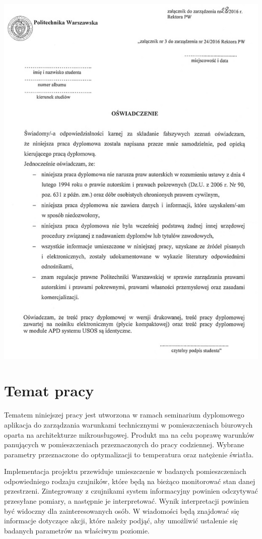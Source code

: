 \documentclass[11pt, a4]{article} %
\begin{document}
\includegraphics[width=1\textwidth]{oswiadczenie_o_samedzielnosci.jpg}

\tableofcontents

\section{Temat pracy}

Tematem niniejszej pracy jest utworzona w ramach seminarium dyplomowego aplikacja do 
zarządzania warunkami technicznymi w pomieszczeniach biurowych oparta na architekturze 
mikrousługowej. Produkt ma na celu poprawę warunków panujących w pomieszczeniach 
przeznaczonych do pracy codziennej. Wybrane parametry przeznaczone do optymalizacji to 
temperatura oraz natężenie światła.

Implementacja projektu przewiduje umieszczenie w badanych pomieszczeniach odpowiedniego 
rodzaju czujników, które będą na bieżąco monitorować stan danej przestrzeni. 
Zintegrowany z czujnikami system informacyjny powinien odczytywać przesyłane 
pomiary, a następnie je interpretować. Wynik interpretacji powinien być widoczny dla 
zainteresowanych osób. W wiadomości będą znajdować się informacje dotyczące 
akcji, które należy podjąć, aby umożliwić ustalenie się badanych parametrów na 
właściwym poziomie.
\end{document}
